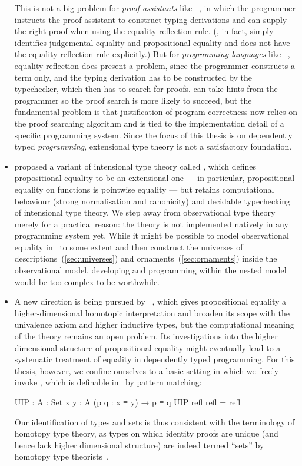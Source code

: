 \begin{itemize}
This is not a big problem for \emph{proof assistants} like ~\citep{Constable-Nuprl}, in which the programmer instructs the proof assistant to construct typing derivations and can supply the right proof when using the equality reflection rule.
(, in fact, simply identifies judgemental equality and propositional equality and does not have the equality reflection rule explicitly.)
But for \emph{programming languages} like ~\citep{Sheard-Omega}, equality reflection does present a problem, since the programmer constructs a term only, and the typing derivation has to be constructed by the typechecker, which then has to search for proofs.
 can take hints from the programmer so the proof search is more likely to succeed, but the fundamental problem is that justification of program correctness now relies on the proof searching algorithm and is tied to the implementation detail of a specific programming system.
Since the focus of this thesis is on dependently typed \emph{programming}, extensional type theory is not a satisfactory foundation.

\item \citet{Altenkirch-OTT} proposed a variant of intensional type theory called , which defines propositional equality to be an extensional one --- in particular, propositional equality on functions is pointwise equality --- but retains computational behaviour (strong normalisation and canonicity) and decidable typechecking of intensional type theory.
We step away from observational type theory merely for a practical reason: the theory is not implemented natively in any programming system yet.
While it might be possible to model observational equality in \Agda\ to some extent and then construct the universes of descriptions~(\autoref{sec:universes}) and ornaments~(\autoref{sec:ornaments}) inside the observational model, developing and programming within the nested model would be too complex to be worthwhile.

\item A new direction is being pursued by ~\citep{UFP-HoTT}, which gives propositional equality a higher-dimensional homotopic interpretation and broaden its scope with the univalence axiom and higher inductive types, but the computational meaning of the theory remains an open problem.
Its investigations into the higher dimensional structure of propositional equality might eventually lead to a systematic treatment of equality in dependently typed programming.
For this thesis, however, we confine ourselves to a basic setting in which we freely invoke , which is definable in \Agda\ by pattern matching:
\begin{code}
UIP : {A : Set} {x y : A} (p q : x ≡ y) → p ≡ q
UIP refl refl = refl
\end{code}
Our identification of types and sets is thus consistent with the terminology of homotopy type theory, as types on which identity proofs are unique (and hence lack higher dimensional structure) are indeed termed ``sets'' by homotopy type theorists~\cite[Section~3.1]{UFP-HoTT}.
\end{itemize}

